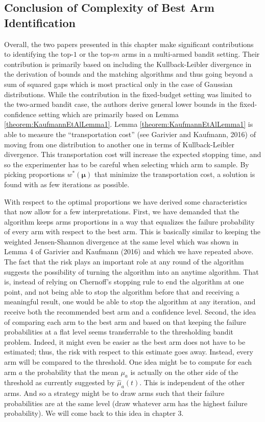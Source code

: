 \documentclass[12pt,]{article}
\begin{document}
\subsection{Conclusion of Complexity of Best Arm
Identification}\label{conclusion-of-complexity-of-best-arm-identification}

Overall, the two papers presented in this chapter make significant
contributions to identifying the top-\(1\) or the top-\(m\) arms in a
multi-armed bandit setting. Their contribution is primarily based on
including the Kullback-Leibler divergence in the derivation of bounds
and the matching algorithms and thus going beyond a sum of squared gaps
which is most practical only in the case of Gaussian distributions.
While the contribution in the fixed-budget setting was limited to the
two-armed bandit case, the authors derive general lower bounds in the
fixed-confidence setting which are primarily based on Lemma
\ref{theorem:KaufmannEtAlLemma1}. Lemma \ref{theorem:KaufmannEtAlLemma1}
is able to measure the ``transportation cost'' (see Garivier and
Kaufmann, 2016) of moving from one distribution to another one in terms
of Kullback-Leibler divergence. This transportation cost will increase
the expected stopping time, and so the experimenter has to be careful
when selecting which arm to sample. By picking proportions
\(w^*(\bm{\mu})\) that minimize the transportation cost, a solution is
found with as few iterations as possible.

With respect to the optimal proportions we have derived some
characteristics that now allow for a few interpretations. First, we have
demanded that the algorithm keeps arms proportions in a way that
equalizes the failure probability of every arm with respect to the best
arm. This is basically similar to keeping the weighted Jensen-Shannon
divergence at the same level which was shown in Lemma 4 of Garivier and
Kaufmann (2016) and which we have repeated above. The fact that the risk
plays an important role at any round of the algorithm suggests the
possibility of turning the algorithm into an anytime algorithm. That is,
instead of relying on Chernoff's stopping rule to end the algorithm at
one point, and not being able to stop the algorithm before that and
receiving a meaningful result, one would be able to stop the algorithm
at any iteration, and receive both the recommended best arm and a
confidence level. Second, the idea of comparing each arm to the best arm
and based on that keeping the failure probabilities at a flat level
seems transferrable to the thresholding bandit problem. Indeed, it might
even be easier as the best arm does not have to be estimated; thus, the
risk with respect to this estimate goes away. Instead, every arm will be
compared to the threshold. One idea might be to compute for each arm
\(a\) the probability that the mean \(\mu_a\) is actually on the other
side of the threshold as currently suggested by \(\hat{\mu}_a(t)\). This
is independent of the other arms. And so a strategy might be to draw
arms such that their failure probabilities are at the same level (draw
whatever arm has the highest failure probability). We will come back to
this idea in chapter 3.
\end{document}

